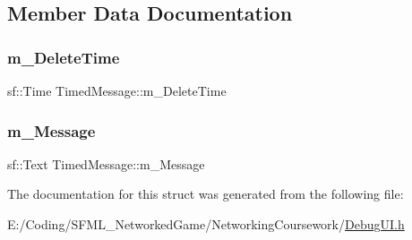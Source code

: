 \subsection{Member Data Documentation}
\hypertarget{struct_timed_message_a9fcb14f06f9ea20e38b4df8d3cbe210b}{}\label{struct_timed_message_a9fcb14f06f9ea20e38b4df8d3cbe210b} 
\subsubsection{\texorpdfstring{m\+\_\+\+Delete\+Time}{m\_DeleteTime}}
{\footnotesize\ttfamily sf\+::\+Time Timed\+Message\+::m\+\_\+\+Delete\+Time}

\hypertarget{struct_timed_message_a139ff1ef0877da4e0033147886241509}{}\label{struct_timed_message_a139ff1ef0877da4e0033147886241509} 
\subsubsection{\texorpdfstring{m\+\_\+\+Message}{m\_Message}}
{\footnotesize\ttfamily sf\+::\+Text Timed\+Message\+::m\+\_\+\+Message}



The documentation for this struct was generated from the following file\+:\begin{DoxyCompactItemize}
\item 
E\+:/\+Coding/\+S\+F\+M\+L\+\_\+\+Networked\+Game/\+Networking\+Coursework/\hyperlink{_debug_u_i_8h}{Debug\+U\+I.\+h}\end{DoxyCompactItemize}
